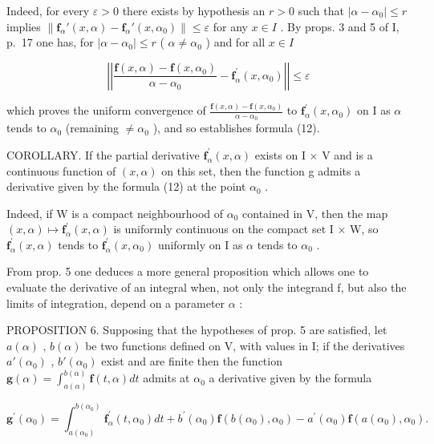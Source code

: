 Indeed, for every \(\varepsilon > 0\) there exists by hypothesis an \(r > 0\) such that \(|\alpha - \alpha_0| \leqslant r\) implies \(\left\| \mathbf{f}_{\alpha}'(x, \alpha) - \mathbf{f}_{\alpha}'(x, \alpha_0) \right\| \leqslant \varepsilon\) for any \(x \in I\) . By props. 3 and 5 of I, p.~17 one has, for \(|\alpha - \alpha_0| \leqslant r\) ( \(\alpha \neq \alpha_0\) ) and for all \(x \in I\)

\[
\left| \left| \frac {\mathbf {f} (x , \alpha) - \mathbf {f} (x , \alpha_ {0})}{\alpha - \alpha_ {0}} - \mathbf {f} _ {\alpha} ^ {\prime} (x, \alpha_ {0}) \right| \right| \leqslant \varepsilon
\]

which proves the uniform convergence of \(\frac{\mathbf{f}(x,\alpha)-\mathbf{f}(x,\alpha_{0})}{\alpha-\alpha_{0}}\) to \(\mathbf{f}_{\alpha}^{\prime}(x,\alpha_{0})\) on I as \(\alpha\) tends to \(\alpha_{0}\) (remaining \(\neq\alpha_{0}\) ), and so establishes formula (12).

COROLLARY. If the partial derivative \(\mathbf{f}_{\alpha}^{\prime}(x,\alpha)\) exists on I × V and is a continuous function of \((x,\alpha)\) on this set, then the function g admits a derivative given by the formula (12) at the point \(\alpha_{0}\) .

Indeed, if W is a compact neighbourhood of \(\alpha_{0}\) contained in V, then the map \((x,\alpha)\mapsto\mathbf{f}_{\alpha}^{\prime}(x,\alpha)\) is uniformly continuous on the compact set I × W, so \(\mathbf{f}_{\alpha}^{\prime}(x,\alpha)\) tends to \(\mathbf{f}_{\alpha}^{\prime}(x,\alpha_{0})\) uniformly on I as \(\alpha\) tends to \(\alpha_{0}\) .

From prop. 5 one deduces a more general proposition which allows one to evaluate the derivative of an integral when, not only the integrand f, but also the limits of integration, depend on a parameter \(\alpha\) :

PROPOSITION 6. Supposing that the hypotheses of prop. 5 are satisfied, let \(a(\alpha)\) , \(b(\alpha)\) be two functions defined on V, with values in I; if the derivatives \(a'(\alpha_0)\) , \(b'(\alpha_0)\) exist and are finite then the function \(\mathbf{g}(\alpha) = \int_{a(\alpha)}^{b(\alpha)} \mathbf{f}(t, \alpha) dt\) admits at \(\alpha_0\) a derivative given by the formula

\[
\mathbf {g} ^ {\prime} (\alpha_ {0}) = \int_ {a (\alpha_ {0})} ^ {b (\alpha_ {0})} \mathbf {f} _ {\alpha} ^ {\prime} (t, \alpha_ {0}) d t + b ^ {\prime} (\alpha_ {0}) \mathbf {f} (b (\alpha_ {0}), \alpha_ {0}) - a ^ {\prime} (\alpha_ {0}) \mathbf {f} (a (\alpha_ {0}), \alpha_ {0}).\tag{13}
\]

